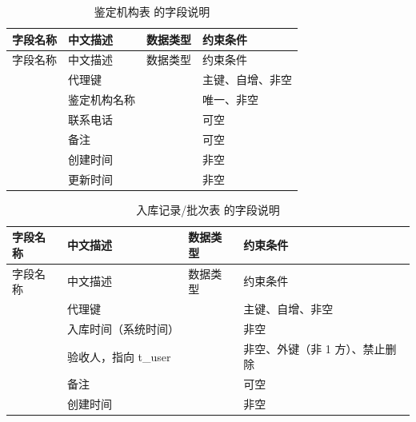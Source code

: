 \begin{longtable}{@{}L{3.5cm} L{4.1cm} L{2.9cm} L{4.0cm}@{}}
\caption{鉴定机构表  的字段说明}\label{tab:f-t-cert-org}\\
\toprule
字段名称 & 中文描述 & 数据类型 & 约束条件 \\
\midrule
\endfirsthead
\toprule
字段名称 & 中文描述 & 数据类型 & 约束条件 \\
\midrule
\endhead
\bottomrule
\endlastfoot
{} & 代理键 &  & 主键、自增、非空 \\
 & 鉴定机构名称 &  & 唯一、非空 \\
 & 联系电话 &  & 可空 \\
 & 备注 &  & 可空 \\
 & 创建时间 &  & 非空 \\
 & 更新时间 &  & 非空 \\
\end{longtable}

\begin{longtable}{@{}L{3.5cm} L{4.1cm} L{2.9cm} L{4.0cm}@{}}
\caption{入库记录/批次表  的字段说明}\label{tab:f-t-stock-in}\\
\toprule
字段名称 & 中文描述 & 数据类型 & 约束条件 \\
\midrule
\endfirsthead
\toprule
字段名称 & 中文描述 & 数据类型 & 约束条件 \\
\midrule
\endhead
\bottomrule
\endlastfoot
{} & 代理键 &  & 主键、自增、非空 \\
 & 入库时间（系统时间） &  & 非空 \\
 & 验收人，指向 t\_user &  & 非空、外键（非 1 方）、禁止删除 \\
 & 备注 &  & 可空 \\
 & 创建时间 &  & 非空 \\
\end{longtable}

